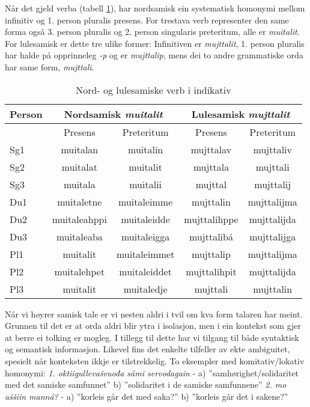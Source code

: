 \documentclass[a4paper,norsk]{article}
\begin{document}
Når det gjeld verba (tabell \ref{verb}), har nordsamisk ein systematisk homonymi mellom infinitiv og 1. person pluralis presens. For trestava verb representer den same forma også 3. person pluralis og 2. person singularis preteritum, alle er \emph{muitalit}. For lulesamisk er dette tre ulike former: Infinitiven er \emph{mujttalit}, 1. person pluralis har halde på opprinneleg \emph{-p} og er \emph{mujttalip}, mens dei to andre grammatiske orda har same form, \emph{mujttali}.%

\begin{table}[htdp]
\caption{Nord- og lulesamiske verb i indikativ}
\begin{center}
\begin{tabular}{|l|c|c||c|c|}
\hline
Person & \multicolumn{2}{|c||}{Nordsamisk \textit{muitalit}} & \multicolumn{2}{|c|}{Lulesamisk \textit{mujttalit}} \\
\hline
 & Presens & Preteritum & Presens & Preteritum \\
\hline \hline 
Sg1 & muitalan & muitalin &  mujttalav & mujttaliv \\
\hline
Sg2 & muitalat & muitalit & mujttala & mujttali \\
\hline
Sg3 & muitala & muitalii & mujttal & mujttalij \\
\hline
\hline
Du1  & muitaletne & muitaleimme & mujttalin & mujttalijma \\
\hline
Du2 & muitaleahppi & muitaleidde & mujttalihppe & mujttalijda \\
\hline
Du3 & muitaleaba & muitaleigga & mujttalibá & mujttalijga \\
\hline
\hline
Pl1  & muitalit & muitaleimmet & mujttalip & mujttalijma \\
\hline
Pl2 & muitalehpet & muitaleiddet & mujttalihpit & mujttalijda  \\
\hline
Pl3 & muitalit & muitaledje & mujttali & mujttalin \\
\hline
\hline
\end{tabular}
\end{center}
\label{verb}
\end{table}%

Når vi høyrer samisk tale er vi nesten aldri i tvil om kva form talaren har meint. Grunnen til det er at orda aldri blir ytra i isolasjon, men i ein kontekst som gjer at berre ei tolking er mogleg. I tillegg til dette har vi tilgang til både syntaktisk og semantisk informasjon. Likevel fins det enkelte tilfeller av ekte ambiguitet, spesielt når konteksten ikkje er tilstrekkelig. To eksempler med komitativ/lokativ homonymi: \textit{1. oktiigullevašvuođa sámi servodagain}  - a) ''samhørighet/solidaritet med det samiske samfunnet'' b) ''solidaritet i de samiske samfunnene'' \textit{2. mo aššiin manná?} - a) ''korleis går det med saka?'' b) ''korleis går det i sakene?'' 
\end{document}
